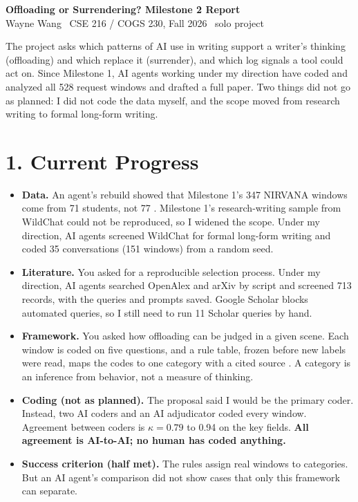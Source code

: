 \documentclass[11pt]{article}
\begin{document}
{\large\bfseries Offloading or Surrendering? Milestone 2 Report}\\
Wayne Wang \textbullet\ CSE 216 / COGS 230, Fall 2026 \textbullet\ solo project

The project asks which patterns of AI use in writing support a writer's thinking (offloading) and which replace it (surrender), and which log signals a tool could act on. Since Milestone 1, AI agents working under my direction have coded and analyzed all 528 request windows and drafted a full paper. Two things did not go as planned: I did not code the data myself, and the scope moved from research writing to formal long-form writing.

\section{1. Current Progress}

\begin{itemize}
  \item \textbf{Data.} An agent's rebuild showed that Milestone 1's 347 NIRVANA windows come from 71 students, not 77 \cite{jelson2026nirvana}. Milestone 1's research-writing sample from WildChat could not be reproduced, so I widened the scope. Under my direction, AI agents screened WildChat \cite{zhao2024} for formal long-form writing and coded 35 conversations (151 windows) from a random seed.
  \item \textbf{Literature.} You asked for a reproducible selection process. Under my direction, AI agents searched OpenAlex and arXiv by script and screened 713 records, with the queries and prompts saved. Google Scholar blocks automated queries, so I still need to run 11 Scholar queries by hand.
  \item \textbf{Framework.} You asked how offloading can be judged in a given scene. Each window is coded on five questions, and a rule table, frozen before new labels were read, maps the codes to one category with a cited source \cite{risko2016,shaw2026}. A category is an inference from behavior, not a measure of thinking.
  \item \textbf{Coding (not as planned).} The proposal said I would be the primary coder. Instead, two AI coders and an AI adjudicator coded every window. Agreement between coders is $\kappa = 0.79$ to 0.94 on the key fields. \textbf{All agreement is AI-to-AI; no human has coded anything.}
  \item \textbf{Success criterion (half met).} The rules assign real windows to categories. But an AI agent's comparison did not show cases that only this framework can separate.
\end{itemize}
\end{document}
